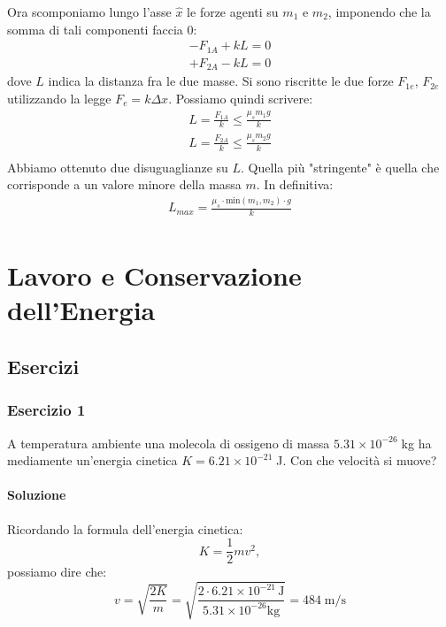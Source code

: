 \documentclass[12pt,a4paper]{book}
\begin{document}
Ora scomponiamo lungo l'asse $\hat{x}$ le forze agenti su $m_1$ e $m_2$,
imponendo che la somma di tali componenti faccia $0$: 
\begin{gather*}
-F_{1A}+kL=0\\
+F_{2A}-kL=0
\end{gather*}
dove $L$ indica la distanza fra le due masse. Si sono riscritte le due forze $F_{1e}$, $F_{2e}$ utilizzando
la legge $F_e=k\Delta x$. Possiamo quindi scrivere:
\begin{gather*}
L=\frac{F_{1A}}{k} \leq \frac{\mu_s m_1 g}{k}\\
L=\frac{F_{2A}}{k} \leq \frac{\mu_s m_2 g}{k}\\
\end{gather*}
Abbiamo ottenuto due disuguaglianze su $L$. Quella più "stringente" è quella che corrisponde a un valore minore della massa $m$. In definitiva: 
\begin{gather*}
L_{max}=\frac{\mu_s \cdot \text{min}(m_1,m_2)\cdot g}{k}\\
\end{gather*}

\chapter{Lavoro e Conservazione dell'Energia}
\section{Esercizi}

\subsection*{Esercizio 1}
A temperatura ambiente una molecola di ossigeno di massa $5.31\times 10^{-26}\;$kg ha mediamente un'energia cinetica  $K=6.21\times 10^{-21}\;$J. Con che velocità si muove?

\subsubsection*{Soluzione}
Ricordando la formula dell'energia cinetica:
\begin{equation*}
K=\frac{1}{2}mv^{2},
\end{equation*}
possiamo dire che:
\begin{equation*}
v=\sqrt{\frac{2K}{m}}=\sqrt{\frac{2\cdot 6.21\times 10^{-21}\, \text{J}}{5.31\times 10^{-26}\text{kg}}}=484\; \text{m}/\text{s}
\end{equation*}
\end{document}
